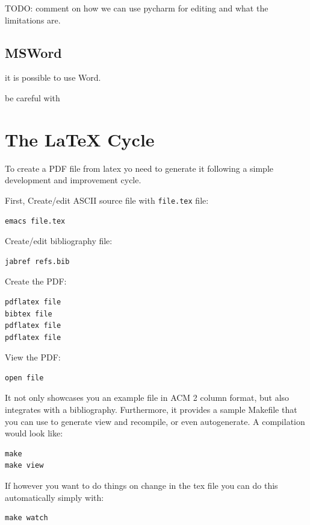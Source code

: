 TODO: comment on how we can use pycharm for editing and what the
limitations are.

\subsection{MSWord}

it is possible to use Word.

be careful with 

\section{The LaTeX Cycle}\label{the-latex-cycle}

To create a PDF file from latex yo need to generate it following a
simple development and improvement cycle.

First, Create/edit ASCII source file with \texttt{file.tex} file:

\begin{verbatim}
emacs file.tex
\end{verbatim}

Create/edit bibliography file:

\begin{verbatim}
jabref refs.bib
\end{verbatim}

Create the PDF:

\begin{verbatim}
pdflatex file
bibtex file
pdflatex file
pdflatex file
\end{verbatim}

View the PDF:

\begin{verbatim}
open file
\end{verbatim}

It not only showcases you an example file in ACM 2 column format, but
also integrates with a bibliography. Furthermore, it provides a sample
Makefile that you can use to generate view and recompile, or even
autogenerate. A compilation would look like:

\begin{verbatim}
make
make view
\end{verbatim}

If however you want to do things on change in the tex file you can do
this automatically simply with:

\begin{verbatim}
make watch
\end{verbatim}

